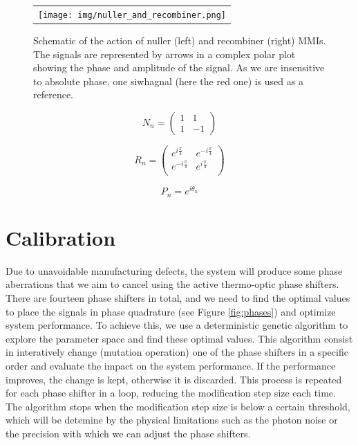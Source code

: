 \documentclass[]{spie}  %
\begin{document}
\begin{figure} [H]
    \begin{center}
    \begin{tabular}{c}
    \texttt{[image: img/nuller\_and\_recombiner.png]}
    \end{tabular}
    \end{center}
    \caption[nuller_and_recombiner] 
    { \label{fig:nuller_and_recombiner} 
    Schematic of the action of nuller (left) and recombiner (right) MMIs. The signals are represented by arrows in a complex polar plot showing the phase and amplitude of the signal. As we are insensitive to absolute phase, one siwhagnal (here the red one) is used as a reference.}
\end{figure}

\begin{equation}\label{N}
    N_n =
    \begin{pmatrix}
        1 & 1 \\
        1 & -1
    \end{pmatrix}
\end{equation}

\begin{equation}\label{R}
    R_n =
    \begin{pmatrix}
        e^{i\frac{\pi}{4}} & e^{-i\frac{\pi}{4}} \\
        e^{-i\frac{\pi}{4}} & e^{i\frac{\pi}{4}} \\
    \end{pmatrix}
\end{equation}

\begin{equation}\label{P}
    P_n = e^{i\theta_n}
\end{equation}

\section{Calibration}

Due to unavoidable manufacturing defects, the system will produce some phase aberrations that we aim to cancel using the active thermo-optic phase shifters. There are fourteen phase shifters in total, and we need to find the optimal values to place the signals in phase quadrature (see Figure \ref{fig:phases}) and optimize system performance. To achieve this, we use a deterministic genetic algorithm to explore the parameter space and find these optimal values. This algorithm consist in interatively change (mutation operation) one of the phase shifters in a specific order and evaluate the impact on the system performance. If the performance improves, the change is kept, otherwise it is discarded. This process is repeated for each phase shifter in a loop, reducing the modification step size each time. The algorithm stops when the modification step size is below a certain threshold, which will be detemine by the physical limitations such as the photon noise or the precision with which we can adjust the phase shifters.
\end{document}
